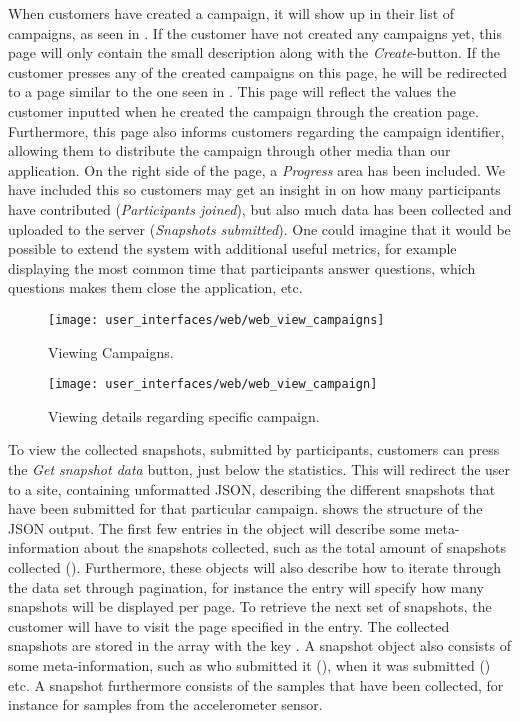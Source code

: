When customers have created a campaign, it will show up in their list of campaigns, as seen in . If the customer have not created any campaigns yet, this page will only contain the small description along with the \emph{Create}-button. If the customer presses any of the created campaigns on this page, he will be redirected to a page similar to the one seen in . This page will reflect the values the customer inputted when he created the campaign through the creation page. Furthermore, this page also informs customers regarding the campaign identifier, allowing them to distribute the campaign through other media than our application. On the right side of the page, a \emph{Progress} area has been included. We have included this so customers may get an insight in on how many participants have contributed (\emph{Participants joined}), but also much data has been collected and uploaded to the server (\emph{Snapshots submitted}). One could imagine that it would be possible to extend the system with additional useful metrics, for example displaying the most common time that participants answer questions, which questions makes them close the application, etc.

\begin{figure}[!htbp]
\centering
\texttt{[image: user\_interfaces/web/web\_view\_campaigns]}
\caption{Viewing Campaigns.}
\label{fig:web_view_campaigns}
\end{figure}
\FloatBarrier

\begin{figure}[!htbp]
\centering
\texttt{[image: user\_interfaces/web/web\_view\_campaign]}
\caption{Viewing details regarding specific campaign.}
\label{fig:web_view_campaign}
\end{figure}
\FloatBarrier

To view the collected snapshots, submitted by participants, customers can press the \emph{Get snapshot data} button, just below the statistics. This will redirect the user to a site, containing unformatted JSON, describing the different snapshots that have been submitted for that particular campaign.  shows the structure of the JSON output. The first few entries in the object will describe some meta-information about the snapshots collected, such as the total amount of snapshots collected (). Furthermore, these objects will also describe how to iterate through the data set through pagination, for instance the  entry will specify how many snapshots will be displayed per page. To retrieve the next set of snapshots, the customer will have to visit the page specified in the  entry. The collected snapshots are stored in the array with the key . A snapshot object also consists of some meta-information, such as who submitted it (), when it was submitted () etc. A snapshot furthermore consists of the samples that have been collected, for instance  for samples from the accelerometer sensor. 

